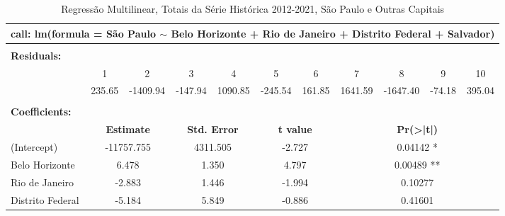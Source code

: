 \documentclass[14pt]{extarticle}
\begin{document}
\begin{landscape}
\pagestyle{empty}


\begin{table}[htbp]
  \centering
  \caption{Regressão Multilinear, Totais da Série Histórica 2012-2021, São Paulo e Outras Capitais}
   \tabcolsep=0.60cm
	\renewcommand{\arraystretch}{1.2}
	\begin{adjustbox}{max width=\linewidth}
    \begin{tabular}{lllllllllll}
    \toprule
    \multicolumn{11}{c}{\textbf{call: lm(formula = São Paulo $\sim$ Belo Horizonte + Rio de Janeiro + Distrito Federal + Salvador)}} \\
    \midrule
    \multicolumn{11}{c}{} \\
    \midrule
    \multicolumn{11}{l}{\textbf{Residuals:}} \\
         & \multicolumn{1}{c}{1} & \multicolumn{1}{c}{2} & \multicolumn{1}{c}{3} & \multicolumn{1}{c}{4} & \multicolumn{1}{c}{5} & \multicolumn{1}{c}{6} & \multicolumn{1}{c}{7} & \multicolumn{1}{c}{8} & \multicolumn{1}{c}{9} & \multicolumn{1}{c}{10} \\
         & \multicolumn{1}{c}{235.65} & \multicolumn{1}{c}{-1409.94} & \multicolumn{1}{c}{-147.94} & \multicolumn{1}{c}{1090.85} & \multicolumn{1}{c}{-245.54} & \multicolumn{1}{c}{161.85} & \multicolumn{1}{c}{1641.59} & \multicolumn{1}{c}{-1647.40} & \multicolumn{1}{c}{-74.18} & \multicolumn{1}{c}{395.04} \\
    \midrule
    \multicolumn{10}{c}{}                                               &  \\
    \midrule
    \multicolumn{11}{l}{\textbf{Coefficients:}} \\
         & \multicolumn{2}{c}{\textbf{Estimate}} & \multicolumn{2}{c}{\textbf{Std. Error}} & \multicolumn{2}{c}{\textbf{t value}} & \multicolumn{4}{c}{\textbf{Pr(>|t|)   }} \\
    (Intercept) & \multicolumn{2}{c}{-11757.755} & \multicolumn{2}{c}{4311.505} & \multicolumn{2}{c}{-2.727} & \multicolumn{4}{c}{0.04142 *} \\
    Belo Horizonte & \multicolumn{2}{c}{6.478} & \multicolumn{2}{c}{1.350} & \multicolumn{2}{c}{4.797} & \multicolumn{4}{c}{0.00489 **} \\
    Rio de Janeiro & \multicolumn{2}{c}{-2.883} & \multicolumn{2}{c}{1.446} & \multicolumn{2}{c}{-1.994} & \multicolumn{4}{c}{0.10277} \\
    Distrito Federal & \multicolumn{2}{c}{-5.184} & \multicolumn{2}{c}{5.849} & \multicolumn{2}{c}{-0.886} & \multicolumn{4}{c}{0.41601} \\

\end{tabular}
\end{adjustbox}
\end{table}
\end{landscape}
\end{document}

